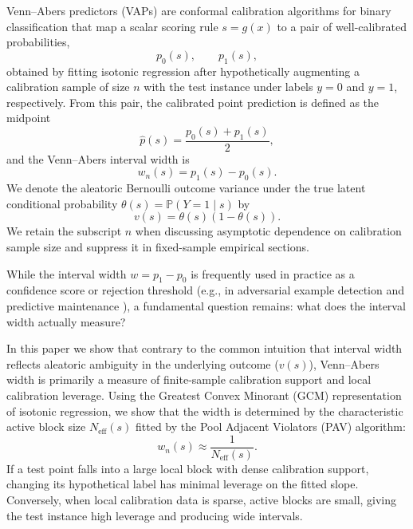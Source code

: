 \documentclass[11pt]{article}
\begin{document}
	Venn--Abers predictors (VAPs) \cite{vovk2014, vovk2015} are conformal calibration algorithms for binary classification that map a scalar scoring rule $s = g(x)$ to a pair of well-calibrated probabilities,
	\begin{equation}
		p_0(s),\qquad p_1(s),
		\label{eq:p0_p1}
	\end{equation}
	obtained by fitting isotonic regression after hypothetically augmenting a calibration sample of size $n$ with the test instance under labels $y=0$ and $y=1$, respectively. From this pair, the calibrated point prediction is defined as the midpoint
	\begin{equation}
		\hat p(s)=\frac{p_0(s)+p_1(s)}{2},
		\label{eq:phat_def}
	\end{equation}
	and the Venn--Abers interval width is
	\begin{equation}
		w_n(s)=p_1(s)-p_0(s).
		\label{eq:wn_def}
	\end{equation}
	We denote the aleatoric Bernoulli outcome variance under the true latent conditional probability $\theta(s) = \mathbb{P}(Y=1 \mid s)$ by
	\begin{equation}
		v(s)=\theta(s)(1-\theta(s)).
		\label{eq:vs_def}
	\end{equation}
	We retain the subscript $n$ when discussing asymptotic dependence on calibration sample size and suppress it in fixed-sample empirical sections.

	While the interval width $w=p_1-p_0$ is frequently used in practice as a confidence score or rejection threshold (e.g., in adversarial example detection \cite{peck2019} and predictive maintenance \cite{johansson2023}), a fundamental question remains: what does the interval width actually measure?

	In this paper we show that contrary to the common intuition that interval width reflects aleatoric ambiguity in the underlying outcome ($v(s)$), Venn--Abers width is primarily a measure of finite-sample calibration support and local calibration leverage. Using the Greatest Convex Minorant (GCM) representation of isotonic regression, we show that the width is determined by the characteristic active block size $N_{\mathrm{eff}}(s)$ fitted by the Pool Adjacent Violators (PAV) algorithm:
	\begin{equation}
		w_n(s) \approx \frac{1}{N_{\mathrm{eff}}(s)}.
		\label{eq:width_approx_block}
	\end{equation}
	If a test point falls into a large local block with dense calibration support, changing its hypothetical label has minimal leverage on the fitted slope. Conversely, when local calibration data is sparse, active blocks are small, giving the test instance high leverage and producing wide intervals.
\end{document}
